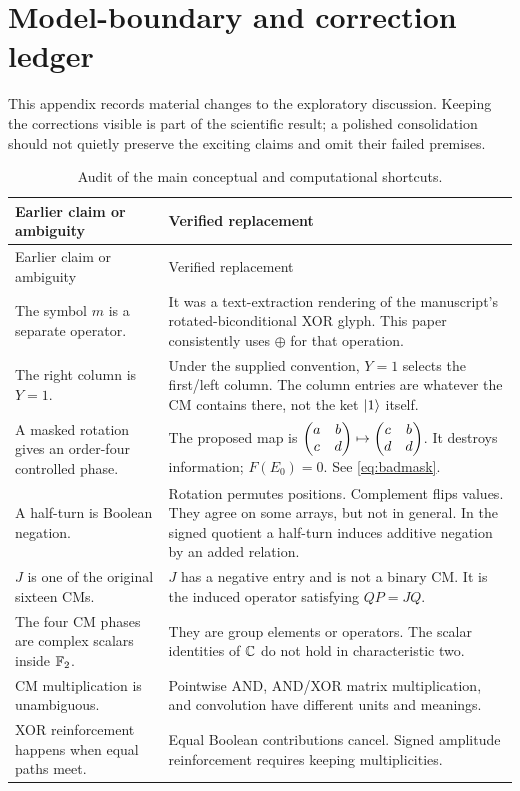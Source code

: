 \section{Model-boundary and correction ledger}\label{app:audit}
This appendix records material changes to the exploratory discussion. Keeping the corrections visible is part of the scientific result; a polished consolidation should not quietly preserve the exciting claims and omit their failed premises.

\begingroup\small
\begin{longtable}{@{}L{0.31\textwidth}L{0.62\textwidth}@{}}
\caption{Audit of the main conceptual and computational shortcuts.}\\
\toprule
Earlier claim or ambiguity & Verified replacement\\
\midrule\endfirsthead
\toprule Earlier claim or ambiguity & Verified replacement\\\midrule\endhead
The symbol $m$ is a separate operator. & It was a text-extraction rendering of the manuscript's rotated-biconditional XOR glyph. This paper consistently uses $\oplus$ for that operation.\\
The right column is $Y=1$. & Under the supplied convention, $Y=1$ selects the first/left column. The column entries are whatever the CM contains there, not the ket $\lvert 1\rangle$ itself.\\
A masked rotation gives an order-four controlled phase. & The proposed map is $\begin{pmatrix}a&b\\c&d\end{pmatrix}\mapsto\begin{pmatrix}c&b\\d&d\end{pmatrix}$. It destroys information; $F(E_0)=0$. See \cref{eq:badmask}.\\
A half-turn is Boolean negation. & Rotation permutes positions. Complement flips values. They agree on some arrays, but not in general. In the signed quotient a half-turn induces additive negation by an added relation.\\
$J$ is one of the original sixteen CMs. & $J$ has a negative entry and is not a binary CM. It is the induced operator satisfying $QP=JQ$.\\
The four CM phases are complex scalars inside $\mathbb F_2$. & They are group elements or operators. The scalar identities of $\mathbb C$ do not hold in characteristic two.\\
CM multiplication is unambiguous. & Pointwise AND, AND/XOR matrix multiplication, and convolution have different units and meanings.\\
XOR reinforcement happens when equal paths meet. & Equal Boolean contributions cancel. Signed amplitude reinforcement requires keeping multiplicities.\\

\end{longtable}
